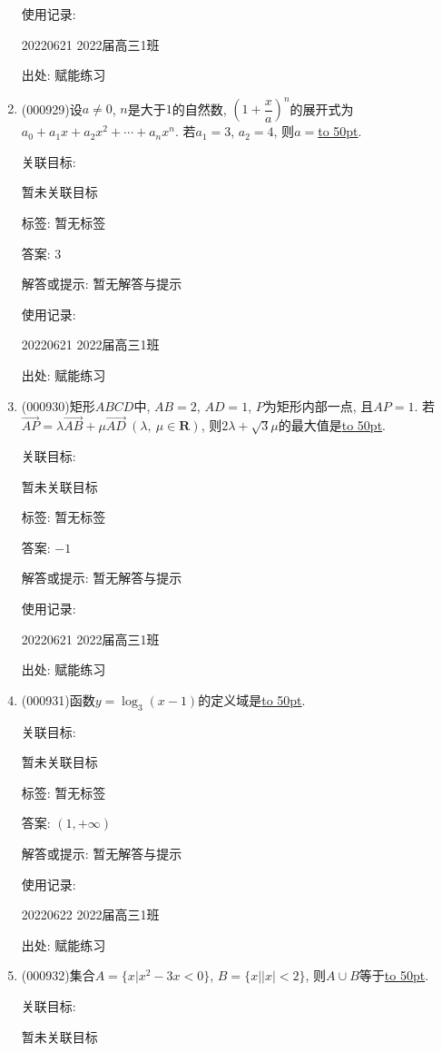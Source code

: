 \documentclass[10pt,a4paper]{article}
\newcommand{\blank}[1]{\underline{\hbox to #1pt{}}}
\begin{document}
\begin{enumerate}[1.]
使用记录:

20220621	2022届高三1班	


出处: 赋能练习
\item { (000929)}设$a\ne 0$, $n$是大于$1$的自然数, $(1+\dfrac xa)^n$的展开式为$a_0+a_1x+a_2x^2+\cdots+a_nx^n$. 若$a_1=3$, $a_2=4$, 则$a=$\blank{50}.


关联目标:

暂未关联目标



标签: 暂无标签

答案: $3$

解答或提示: 暂无解答与提示

使用记录:

20220621	2022届高三1班	


出处: 赋能练习
\item { (000930)}矩形$ABCD$中, $AB=2$, $AD=1$, $P$为矩形内部一点, 且$AP=1$. 若$\overrightarrow{AP}=\lambda \overrightarrow{AB}+\mu \overrightarrow{AD} \ (\lambda,\ \mu \in \mathbf{R})$, 则$2 \lambda +\sqrt3\mu$的最大值是\blank{50}.


关联目标:

暂未关联目标



标签: 暂无标签

答案: $-1$

解答或提示: 暂无解答与提示

使用记录:

20220621	2022届高三1班	


出处: 赋能练习
\item { (000931)}函数$y=\log_3 (x-1)$的定义域是\blank{50}.


关联目标:

暂未关联目标



标签: 暂无标签

答案: $(1,+\infty)$

解答或提示: 暂无解答与提示

使用记录:

20220622	2022届高三1班	


出处: 赋能练习
\item { (000932)}集合$A=\{x|x^2-3x<0\}$, $B=\{x||x|<2\}$, 则$A\cup B$等于\blank{50}.


关联目标:

暂未关联目标




\end{enumerate}
\end{document}
